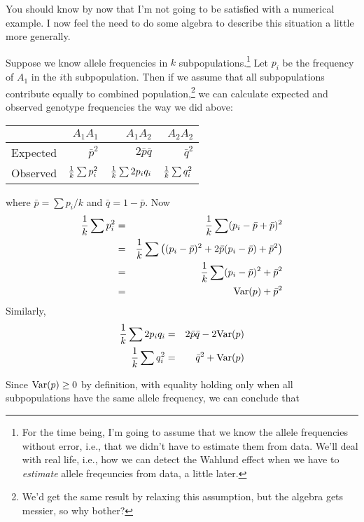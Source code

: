 You should know by now that I'm not going to be satisfied with a
numerical example. I now feel the need to do some algebra to describe
this situation a little more generally.

Suppose we know allele frequencies in $k$ subpopulations.\footnote{For
  the time being, I'm going to assume that we know the allele
  frequencies without error, i.e., that we didn't have to estimate
  them from data. We'll deal with real life, i.e., how we can detect
  the Wahlund effect when we have to {\it estimate\/} allele
  freqeuncies from data, a little later.} Let $p_i$ be the frequency
of $A_1$ in the $i$th subpopulation. Then if we assume that all
subpopulations contribute equally to combined
population,\footnote{We'd get the same result by relaxing this
  assumption, but the algebra gets messier, so why bother?} we can
calculate expected and observed genotype frequencies the way we did
above:

\begin{center}
\begin{tabular}{l|rrr}
\hline\hline
         & $A_1A_1$       & $A_1A_2$         & $A_2A_2$ \\
\hline
Expected & $\bar p^2$     & $2\bar p\bar q$  & $\bar q^2$ \\
Observed & $\frac{1}{k}\sum p_i^2$ & $\frac{1}{k}\sum 2p_iq_i$ & $\frac{1}{k}\sum q_i^2$ \\
\hline
\end{tabular}
\end{center}
where $\bar p = \sum p_i/k$ and $\bar q = 1 - \bar p$. Now
\begin{eqnarray}
\frac{1}{k}\sum p_i^2 &=& \frac{1}{k}\sum (p_i - \bar p + \bar p)^2 \\
&=& \frac{1}{k}\sum \left((p_i - \bar p)^2 + 2\bar p(p_i - \bar p)
                            + \bar p^2\right) \\
             &=& \frac{1}{k}\sum (p_i - \bar p)^2 + \bar p^2 \\
             &=& \hbox{Var}(p) + \bar p^2 \label{eq:p2}
\end{eqnarray}
Similarly,
\begin{eqnarray}
\frac{1}{k}\sum 2p_iq_i &=& 2\bar p\bar q - 2\hbox{Var}(p) \label{eq:2pq} \\
\frac{1}{k}\sum q_i^2   &=& \bar q^2 + \hbox{Var}(p) \label{eq:q2}
\end{eqnarray}

Since $\hbox{Var}(p) \ge 0$ by definition, with equality holding only
when all subpopulations have the same allele frequency, we can
conclude that

